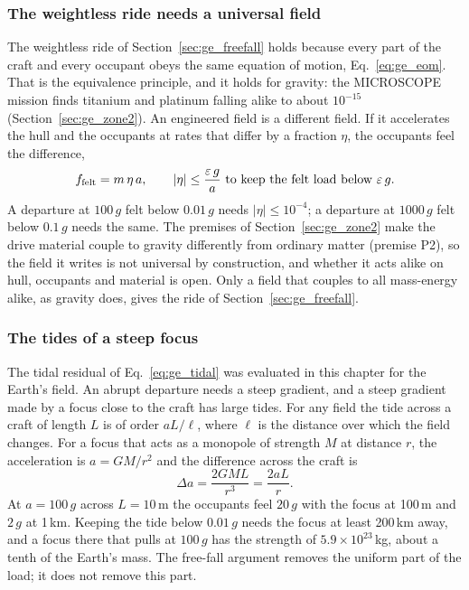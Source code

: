 \subsubsection{The weightless ride needs a universal field}
The weightless ride of Section~\ref{sec:ge_freefall} holds because every part of the craft and every occupant obeys the same equation of motion,
Eq.~\eqref{eq:ge_eom}. That is the equivalence principle, and it holds for gravity: the MICROSCOPE mission finds titanium and platinum falling alike to
about $10^{-15}$~\cite{Touboul2022} (Section~\ref{sec:ge_zone2}). \observed{} An engineered field is a different field. If it accelerates the hull
and the occupants at rates that differ by a fraction $\eta$, the occupants feel the difference,
\begin{equation}
f_{\rm felt}=m\,\eta\,a ,\qquad |\eta|\le\frac{\varepsilon\,g}{a}\ \text{to keep the felt load below }\varepsilon\,g .
\label{eq:pr_eta}
\end{equation}
\derived{} A departure at $100\,g$ felt below $0.01\,g$ needs $|\eta|\le10^{-4}$; a departure at $1000\,g$ felt below $0.1\,g$ needs the same. \calc{}
The premises of Section~\ref{sec:ge_zone2} make the drive material couple to gravity differently from ordinary matter (premise P2), so the field it
writes is not universal by construction, and whether it acts alike on hull, occupants and material is open. \conjecture{} Only a field that couples to
all mass-energy alike, as gravity does, gives the ride of Section~\ref{sec:ge_freefall}. \derived

\subsubsection{The tides of a steep focus}
The tidal residual of Eq.~\eqref{eq:ge_tidal} was evaluated in this chapter for the Earth's field. An abrupt departure needs a steep
gradient, and a steep gradient made by a focus close to the craft has large tides. For any field the tide across a craft of length $L$ is of order $aL/\ell$, where
$\ell$ is the distance over which the field changes. For a focus that acts as a monopole of strength $M$ at distance $r$, the acceleration is
$a=GM/r^2$ and the difference across the craft is
\begin{equation}
\Delta a=\frac{2GML}{r^3}=\frac{2aL}{r} .
\label{eq:pr_focus}
\end{equation}
\derived{} At $a=100\,g$ across $L=10$\,m the occupants feel $20\,g$ with the focus at 100\,m and $2\,g$ at 1\,km. Keeping the tide below
$0.01\,g$ needs the focus at least 200\,km away, and a focus there that pulls at $100\,g$ has the strength of $5.9\times10^{23}$\,kg, about a tenth of
the Earth's mass. \calc{} The free-fall argument removes the uniform part of the load; it does not remove this part. \derived

